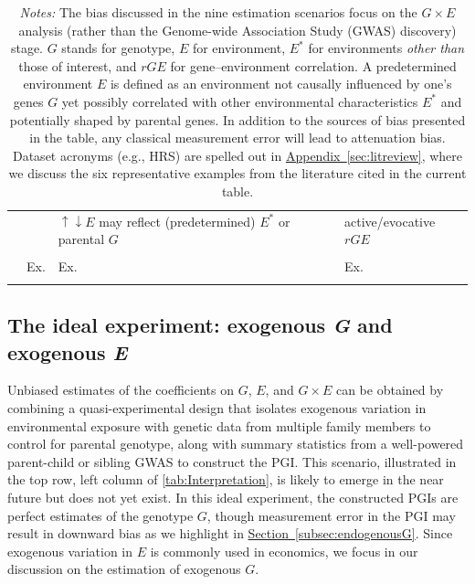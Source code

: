 \documentclass[12pt,a4paper]{article}
\begin{document}
\begin{bibunit}
\begin{landscape}
\begin{table}[H]
{\begin{tabular}{llll}
  &  & $\uparrow \downarrow E$ may reflect (predetermined) $E^*$ or parental $G$  & \indent\hspace{0.3cm} active/evocative $rGE$ \\
  &&&\\
    & Ex. \citet[][Vietnam draft; HRS]{Schmitz2017vietnam} & Ex. \citet[][Family circumstances; HRS]{papageorge2020genes} & Ex. \citet[][Teacher quality; AddHealth]{arold2022genetic}\\
&&&\\
\hline \hline
\end{tabular}}
\caption*{\footnotesize {\textit{Notes:} The bias discussed in the nine estimation scenarios focus on the $G \times E$ analysis (rather than the Genome-wide Association Study (GWAS) discovery) stage. $G$ stands for genotype, $E$ for environment, $E^*$ for environments \textit{other than} those of interest, and $rGE$ for gene--environment correlation. A predetermined environment $E$ is defined as an environment not causally influenced by one's genes $G$ yet possibly correlated with other environmental characteristics $E^*$ and potentially shaped by parental genes. In addition to the sources of bias presented in the table, any classical measurement error will lead to attenuation bias.} Dataset acronyms (e.g., HRS) are spelled out in \hyperref[sec:litreview]{Appendix~\ref*{sec:litreview}}, where we discuss the six representative examples from the literature cited in the current table.}
\end{table}
\end{landscape}

\subsection{The ideal experiment: exogenous \textit{G} and exogenous \textit{E}}
\label{subsec:ideal}

Unbiased estimates of the coefficients on $G$, $E$, and $G \times E$ can be obtained by combining a quasi-experimental design that isolates exogenous variation in environmental exposure with genetic data from multiple family members to control for parental genotype, along with summary statistics from a well-powered parent-child or sibling GWAS to construct the PGI. 
This scenario, illustrated in the top row, left column of \autoref{tab:Interpretation}, is likely to emerge in the near future but does not yet exist.
In this ideal experiment, the constructed PGIs are perfect estimates of the genotype $G$, though measurement error in the PGI may result in downward bias as we highlight in \hyperref[subsec:endogenousG]{Section~\ref*{subsec:endogenousG}}.
Since exogenous variation in $E$ is commonly used in economics, we focus in our discussion on the estimation of exogenous $G$.


\end{bibunit}
\end{document}

